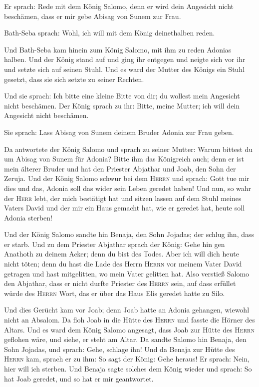  Er sprach: Rede mit dem König Salomo, denn er wird dein
Angesicht nicht beschämen, dass er mir gebe Abisag von Sunem zur Frau.

 Bath-Seba sprach: Wohl, ich will mit dem König
deinethalben reden.

 Und Bath-Seba kam hinein zum König Salomo, mit ihm zu
reden Adonias halben. Und der König stand auf und ging ihr entgegen und
neigte sich vor ihr und setzte sich auf seinen Stuhl. Und es ward der
Mutter des Königs ein Stuhl gesetzt, dass sie sich setzte zu seiner
Rechten.

 Und sie sprach: Ich bitte eine kleine Bitte von dir; du
wollest mein Angesicht nicht beschämen. Der König sprach zu ihr: Bitte,
meine Mutter; ich will dein Angesicht nicht beschämen.

 Sie sprach: Lass Abisag von Sunem deinem Bruder Adonia
zur Frau geben.

 Da antwortete der König Salomo und sprach zu seiner
Mutter: Warum bittest du um Abisag von Sunem für Adonia? Bitte ihm das
Königreich auch; denn er ist mein älterer Bruder und hat den Priester
Abjathar und Joab, den Sohn der Zeruja.  Und der König
Salomo schwur bei dem \textsc{Herrn} und sprach: Gott tue mir dies und
das, Adonia soll das wider sein Leben geredet haben!  Und
nun, so wahr der \textsc{Herr} lebt, der mich bestätigt hat und sitzen
lassen auf dem Stuhl meines Vaters David und der mir ein Haus gemacht
hat, wie er geredet hat, heute soll Adonia sterben!

 Und der König Salomo sandte hin Benaja, den Sohn
Jojadas; der schlug ihn, dass er starb.  Und zu dem
Priester Abjathar sprach der König: Gehe hin gen Anathoth zu deinem
Acker; denn du bist des Todes. Aber ich will dich heute nicht töten;
denn du hast die Lade des Herrn \textsc{Herrn} vor meinem Vater David
getragen und hast mitgelitten, wo mein Vater gelitten hat.
 Also verstieß Salomo den Abjathar, dass er nicht durfte
Priester des \textsc{Herrn} sein, auf dass erfüllet würde des
\textsc{Herrn} Wort, das er über das Haus Elis geredet hatte zu Silo.

 Und dies Gerücht kam vor Joab; denn Joab hatte an Adonia
gehangen, wiewohl nicht an Absalom. Da floh Joab in die Hütte des
\textsc{Herrn} und fasste die Hörner des Altars.  Und es
ward dem König Salomo angesagt, dass Joab zur Hütte des \textsc{Herrn}
geflohen wäre, und siehe, er steht am Altar. Da sandte Salomo hin
Benaja, den Sohn Jojadas, und sprach: Gehe, schlage ihn! 
Und da Benaja zur Hütte des \textsc{Herrn} kam, sprach er zu ihm: So
sagt der König: Gehe heraus! Er sprach: Nein, hier will ich sterben. Und
Benaja sagte solches dem König wieder und sprach: So hat Joab geredet,
und so hat er mir geantwortet.

